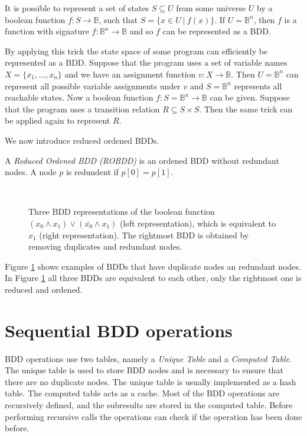 It is possible to represent a set of states $S \subseteq U$ from some universe $U$ by a boolean function $f : S \rightarrow \mathbb{B}$, such that $S = \{ x \in U \ | \ f(x) \}$. If $U = \mathbb{B}^n$, then $f$ is a function with signature $f : \mathbb{B}^n \rightarrow \mathbb{B}$ and so $f$ can be represented as a BDD. 

By applying this trick the state space of some program can efficiently be represented as a BDD. Suppose that the program uses a set of variable names $X = \{ x_1, \dots, x_n \}$ and we have an assignment function $v : X \rightarrow \mathbb{B}$. Then $U = \mathbb{B}^n$ can represent all possible variable assignments under $v$ and $S = \mathbb{B}^n$ represents all reachable states. Now a boolean function $f : S = \mathbb{B}^n \rightarrow \mathbb{B}$ can be given. Suppose that the program uses a transition relation $R \subseteq S \times S$. Then the same trick can be applied again to represent $R$.

We now introduce reduced ordened BDDs.

\begin{definition}
	A \emph{Reduced Ordened BDD (ROBDD)} is an ordened BDD without redundant nodes. A node $p$ is redundent if $p[0] = p[1]$.
\end{definition}

\begin{figure}
	\centering
	$\hspace{36pt}$
	$\hspace{36pt}$
	
	\caption{Three BDD representations of the boolean function $(x_0 \wedge x_1) \vee (\overline{x_0} \wedge x_1)$ (left representation), which is equivalent to $x_1$ (right representation). The rightmost BDD is obtained by removing duplicates and redundant nodes.}
	\label{fig:bdd_reductions}
\end{figure}

Figure \ref{fig:bdd_reductions} shows examples of BDDs that have duplicate nodes an redundant nodes. In Figure \ref{fig:bdd_reductions} all three BDDs are equivalent to each other, only the rightmost one is reduced and ordened. 

\section{Sequential BDD operations}
BDD operations use two tables, namely a \emph{Unique Table} and a \emph{Computed Table}. The unique table is used to store BDD nodes and is necessary to ensure that there are no duplicate nodes. The unique table is usually implemented as a hash table. The computed table acts as a cache. Most of the BDD operations are recursively defined, and the subresults are stored in the computed table. Before performing recursive calls the operations can check if the operation has been done before.

